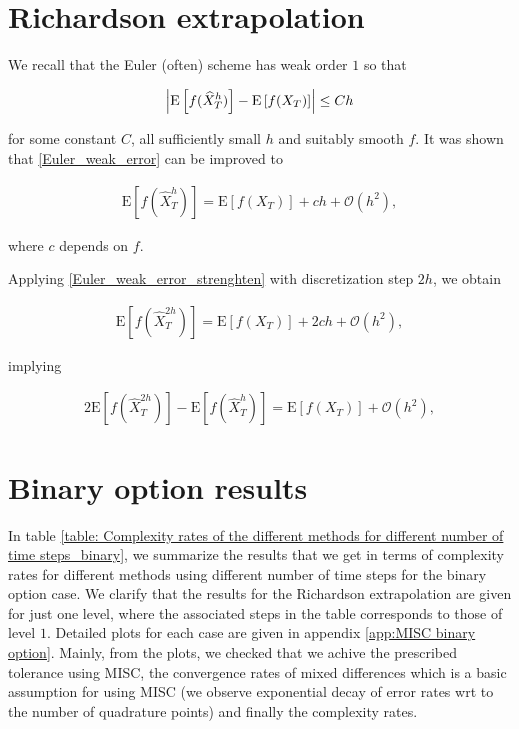 \documentclass[11pt]{article}
\newcommand{\expt}[1]{\mathrm{E}\left[#1\right]}
\newcommand{\COMMA}{,}
\newcommand{\Ordo}[1]{{\mathcal{O}}\left(#1\right)}
\begin{document}
\section{Richardson extrapolation}
We  recall that the Euler (often) scheme has weak order $1$ so that

\begin{align}\label{Euler_weak_error}
	\abs{\expt{f(\hat{X}_T^h)}-\expt{f(X_T)} }  \leq C h
\end{align}

for some constant $C$, all sufficiently small $h$ and suitably smooth $f$. It was shown that \ref{Euler_weak_error} can be improved to


\begin{align}\label{Euler_weak_error_strenghten}
	\expt{f(\hat{X}_T^h)}= \expt{f(X_T)} + c h +\Ordo{h^2} \COMMA
\end{align}


where $c$ depends on $f$. 

Applying \ref{Euler_weak_error_strenghten} with discretization step $2h$, we  obtain

\begin{align}\label{Euler_weak_error_strenghten_2h}
	\expt{f(\hat{X}_T^{2h})}= \expt{f(X_T)} + 2 c h +\Ordo{h^2} \COMMA
\end{align}

implying

\begin{align}\label{Richardson_extrapol}
	2 \expt{f(\hat{X}_T^{2h})}- \expt{f(\hat{X}_T^{h})} =\expt{f(X_T)} + \Ordo{h^2} \COMMA
\end{align}

\section{Binary option results}
In table \ref{table: Complexity rates of the different methods for different number of time steps_binary}, we summarize the results that we get in terms of complexity rates for different methods using different number of time steps for the binary option case. We clarify that the results for the Richardson extrapolation are given for just one level, where the associated steps in the table corresponds to those of level $1$. Detailed plots for each case are given in appendix \ref{app:MISC binary option}. Mainly, from the plots,  we checked that we achive the prescribed tolerance using MISC, the convergence rates of mixed differences which is a basic assumption for using MISC (we observe exponential decay of error rates wrt to the number of quadrature points) and finally the complexity rates.
\end{document}
